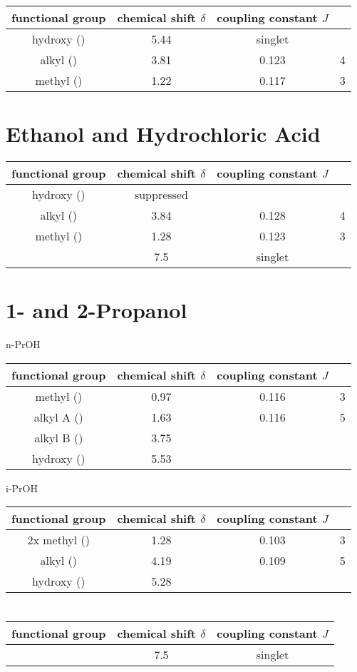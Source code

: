 \center
{
	\begin{tabular}{cSSc}
		\toprule
		functional group&	{chemical shift $\delta$}&	{coupling constant $J$}\\
		\midrule
		hydroxy ()&	5.44& {singlet}\\
		alkyl ()&	3.81&	0.123&	4\\
		methyl ()&	1.22&	0.117&	3\\
		\bottomrule
	\end{tabular}
}

\section{Ethanol and Hydrochloric Acid}

\center
{
	\begin{tabular}{cSSc}
		\toprule
		functional group&	{chemical shift $\delta$}&	{coupling constant $J$}\\
		\midrule
		hydroxy ()&	suppressed\\
		alkyl ()&	3.84&	0.128&	4\\
		methyl ()&	1.28&	0.123&	3\\
		&	7.5& {singlet}\\
		\bottomrule
	\end{tabular}
}

\section{1- and 2-Propanol}

\center
{
	n-PrOH\\
	\begin{tabular}{cSSc}
		\toprule
		functional group&	{chemical shift $\delta$}&	{coupling constant $J$}\\
		\midrule
		methyl ()&	0.97&	0.116&	3\\
		alkyl A ()&	1.63&	0.116&	5\\
		alkyl B ()&	3.75&	\\
		hydroxy ()&	5.53&	\\
		\bottomrule
	\end{tabular}

	i-PrOH\\
	\begin{tabular}{cSSc}
		\toprule
		functional group&	{chemical shift $\delta$}&	{coupling constant $J$}\\
		\midrule
		2x methyl ()&	1.28&	0.103& 3\\
		alkyl ()&	4.19&	0.109&	5\\
		hydroxy ()&	5.28&	\\
		\bottomrule
	\end{tabular}
}

\section{}

\center
{
	\begin{tabular}{cSS}
		\toprule
		functional group&	{chemical shift $\delta$}&	{coupling constant $J$}\\
		\midrule

		&	7.5& {singlet}\\
		\bottomrule
	\end{tabular}
}
